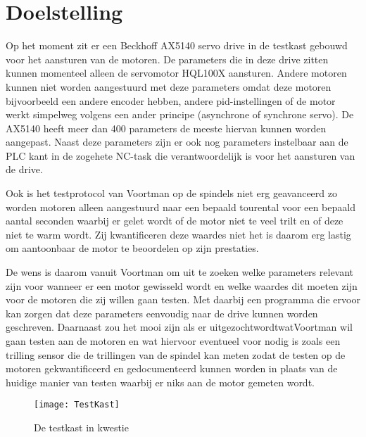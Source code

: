 \section{Doelstelling}

Op het moment zit er een Beckhoff \gls{AX5140} servo drive in de testkast gebouwd
voor het aansturen van de motoren. De parameters die in deze drive zitten kunnen
momenteel alleen de servomotor HQL100X aansturen. Andere motoren kunnen
niet worden aangestuurd met deze parameters omdat deze motoren bijvoorbeeld
een andere encoder hebben, andere \gls{pid}-instellingen of de motor werkt simpelweg
volgens een ander principe (asynchrone of synchrone servo). De \gls{AX5140} heeft
meer dan 400 parameters de meeste hiervan kunnen worden aangepast. Naast deze
parameters zijn er ook nog parameters instelbaar aan de \gls{PLC} kant in de zogehete
\gls{NC}-task die verantwoordelijk is voor het aansturen van de drive.

\vspace{0.5cm}

Ook is het testprotocol van Voortman op de spindels niet erg geavanceerd zo
worden motoren alleen aangestuurd naar een bepaald tourental voor een bepaald
aantal seconden waarbij er gelet wordt of de motor niet te veel trilt en of deze niet
te warm wordt. Zij kwantificeren deze waardes niet het is daarom erg lastig om
aantoonbaar de motor te beoordelen op zijn prestaties.

\vspace{0.5cm}

De wens is daarom vanuit Voortman om uit te zoeken welke parameters relevant
zijn voor wanneer er een motor gewisseld wordt en welke waardes dit moeten zijn
voor de motoren die zij willen gaan testen. Met daarbij een programma die ervoor
kan zorgen dat deze parameters eenvoudig naar de drive kunnen worden geschreven.
Daarnaast zou het mooi zijn als er uitgezochtwordtwatVoortman wil gaan testen aan
de motoren en wat hiervoor eventueel voor nodig is zoals een trilling sensor die de
trillingen van de spindel kan meten zodat de testen op de motoren gekwantificeerd en
gedocumenteerd kunnen worden in plaats van de huidige manier van testen waarbij
er niks aan de motor gemeten wordt.

\begin{figure}[H]
	\centering
	\texttt{[image: TestKast]}
	\label{fig:Testkast}
	\caption{De testkast in kwestie}
\end{figure}